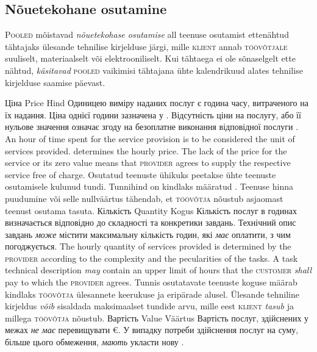 \begin{Form}
\begin{paracol}{3}
{        \subsection{Nõuetekohane osutamine}
        P\textsc{ooled} mõistavad \emph{nõuetekohase osutamise} all teenuse osutamist ettenähtud tähtajaks ülesande tehnilise kirjelduse järgi, mille \textsc{klient} annab \textsc{töövõtjale} suuliselt, materiaalselt või elektrooniliselt. Kui tähtaega ei ole sõnaselgelt ette nähtud, \emph{käsitavad} \textsc{pooled} vaikimisi tähtajana ühte kalendrikuud alates tehnilise kirjelduse saamise päevast.
        }
      \clause
        {Ціна}
        {Price}
        {Hind}
        {Одиницею виміру наданих послуг є година часу, витраченого на їх надання. Ціна однієї години зазначена у . Відсутність ціни на послугу, або її нульове значення означає згоду на безоплатне виконання відповідної послуги .}
        {An hour of time spent for the service provision is to be considered the unit of services provided.  determines the hourly price. The lack of the price for the service or its zero value means that \textsc{provider} agrees to supply the respective service free of charge.}
        {Osutatud teenuste ühikuks peetakse ühte teenuste osutamisele kulunud tundi. Tunnihind on kindlaks määratud . Teenuse hinna puudumine või selle nullväärtus tähendab, et \textsc{töövõtja} nõustub asjaomast teenust osutama tasuta.
        }
      \clause
        {Кількість}
        {Quantity}
        {Kogus}
        {Кількість послуг в годинах визначається  відповідно до складності та конкретики завдань. Технічний опис завдань \emph{може} містити максимальну кількість годин, які  \emph{має} оплатити, з чим  погоджується.}
        {The hourly quantity of services provided is determined by the \textsc{provider} according to the complexity and the pecularities of the tasks. A task technical description \emph{may} contain an upper limit of hours that the \textsc{customer} \emph{shall} pay to which the \textsc{provider} agrees.}
        {Tunnis osutatavate teenuste koguse määrab kindlaks \textsc{töövõtja} ülesannete keerukuse ja eripärade alusel. Ülesande tehniline kirjeldus \emph{võib} sisaldada maksimaalset tundide arvu, mille eest \textsc{klient} \emph{tasub} ja millega \textsc{töövõtja} nõustub.
}
      \clause
        {Вартість}
        {Value}
        {Väärtus}
        {Вартість послуг, здійснених у межах  \textit{не має} перевищувати  €. У випадку потреби здійснення послуг на суму, більше цього обмеження,  \textit{мають} укласти нову .}

\end{paracol}
\end{Form}
